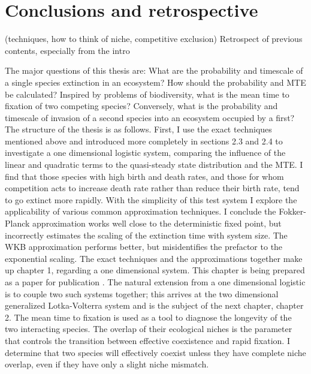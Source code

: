 \section{Conclusions and retrospective}
 (techniques, how to think of niche, competitive exclusion)
Retrospect of previous contents, especially from the intro

\iffalse
The major questions of this thesis are: What are the probability and timescale of a single species extinction in an ecosystem? How should the probability and MTE be calculated? Inspired by problems of biodiversity, what is the mean time to fixation of two competing species? Conversely, what is the probability and timescale of invasion of a second species into an ecosystem occupied by a first? 
The structure of the thesis is as follows. 
First, I use the exact techniques mentioned above and introduced more completely in sections 2.3 and 2.4 to investigate a one dimensional logistic system, comparing the influence of the linear and quadratic terms to the quasi-steady state distribution and the MTE. %
I find that those species with high birth and death rates, and those for whom competition acts to increase death rate rather than reduce their birth rate, tend to go extinct more rapidly. %
With the simplicity of this test system I explore the applicability of various common approximation techniques. 
I conclude the Fokker-Planck approximation works well close to the deterministic fixed point, but incorrectly estimates the scaling of the extinction time with system size. The WKB approximation performs better, but misidentifies the prefactor to the exponential scaling. %
The exact techniques and the approximations together make up chapter 1, regarding a one dimensional system. %
This chapter is being prepared as a paper for publication \cite{Badali2018a}. 
The natural extension from a one dimensional logistic is to couple two such systems together; this arrives at the two dimensional generalized Lotka-Volterra system and is the subject of the next chapter, chapter 2. %
The mean time to fixation is used as a tool to diagnose the longevity of the two interacting species. 
The overlap of their ecological niches is the parameter that controls the transition between effective coexistence and rapid fixation. 
I determine that two species will effectively coexist unless they have complete niche overlap, even if they have only a slight niche mismatch. %
